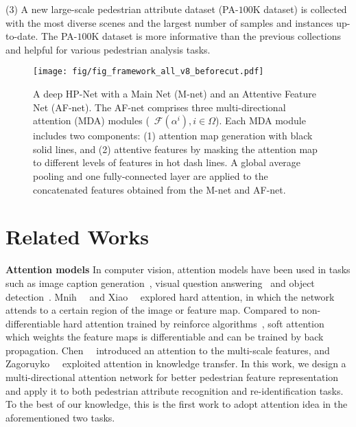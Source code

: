 \documentclass[10pt,twocolumn,letterpaper]{article}
\begin{document}
(3) A new large-scale pedestrian attribute dataset (PA-$100$K dataset) is collected with the most diverse scenes and the largest number of samples and instances up-to-date.
The PA-$100$K dataset is more informative than the previous collections and helpful for various pedestrian analysis tasks.







\begin{figure}[t]
\centering
\texttt{[image: fig/fig\_framework\_all\_v8\_beforecut.pdf]}
\caption{A deep HP-Net with a Main Net (M-net) and an Attentive Feature Net (AF-net). The AF-net comprises three multi-directional attention (MDA) modules (\ie~$\mathcal{F}(\alpha^i), i\in\Omega$). Each MDA module includes two components: (1) attention map generation with black solid lines, and (2) attentive features by masking the attention map to different levels of features in hot dash lines. A global average pooling and one fully-connected layer are applied to the concatenated features obtained from the M-net and AF-net.
}
\label{fig:framework}
\end{figure}


\section{Related Works}
\label{sec:related_work}

\noindent \textbf{Attention models}
In computer vision, attention models have been used in tasks such as image caption generation~\cite{xu2015show}, visual question answering~\cite{lu2016hierarchical,xu2016ask} and object detection~\cite{ba2014multiple}.
Mnih~\etal~\cite{mnih2014recurrent} and Xiao~\etal~\cite{xiao2015application} explored hard attention, in which the network attends to a certain region of the image or feature map.
Compared to non-differentiable hard attention trained by reinforce algorithms~\cite{williams1992simple}, soft attention which weights the feature maps is differentiable and can be trained by back propagation.
Chen~\etal~\cite{chen2016attention} introduced an attention to the multi-scale features, and Zagoruyko~\etal~\cite{zagoruyko2016paying} exploited attention in knowledge transfer. In this work, we design a multi-directional attention network for better pedestrian feature representation and apply it to both pedestrian attribute recognition and re-identification tasks. To the best of our knowledge, this is the first work to adopt attention idea in the aforementioned two tasks.
\end{document}

